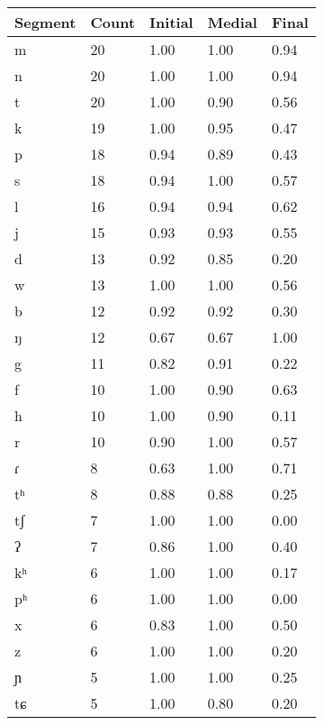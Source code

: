 \begin{longtable}{|l|l|l|l|l|}
\hline
Segment & Count & Initial & Medial & Final \\ \hline 
m        & 20    & 1.00    & 1.00   & 0.94  \\ \hline 
n        & 20    & 1.00    & 1.00   & 0.94  \\ \hline
t        & 20    & 1.00    & 0.90   & 0.56  \\ \hline
k        & 19    & 1.00    & 0.95   & 0.47  \\ \hline
p        & 18    & 0.94    & 0.89   & 0.43  \\ \hline
s        & 18    & 0.94    & 1.00   & 0.57  \\ \hline
l        & 16    & 0.94    & 0.94   & 0.62  \\ \hline
j        & 15    & 0.93    & 0.93   & 0.55  \\ \hline
d        & 13    & 0.92    & 0.85   & 0.20  \\ \hline
w        & 13    & 1.00    & 1.00   & 0.56  \\ \hline
b        & 12    & 0.92    & 0.92   & 0.30  \\ \hline
ŋ        & 12    & 0.67    & 0.67   & 1.00  \\ \hline
g        & 11    & 0.82    & 0.91   & 0.22  \\ \hline
f        & 10    & 1.00    & 0.90   & 0.63  \\ \hline
h        & 10    & 1.00    & 0.90   & 0.11  \\ \hline
r        & 10    & 0.90    & 1.00   & 0.57  \\ \hline
ɾ        & 8     & 0.63    & 1.00   & 0.71  \\ \hline
tʰ       & 8     & 0.88    & 0.88   & 0.25  \\ \hline
tʃ       & 7     & 1.00    & 1.00   & 0.00  \\ \hline
ʔ        & 7     & 0.86    & 1.00   & 0.40  \\ \hline
kʰ       & 6     & 1.00    & 1.00   & 0.17  \\ \hline
pʰ       & 6     & 1.00    & 1.00   & 0.00  \\ \hline
x        & 6     & 0.83    & 1.00   & 0.50  \\ \hline
z        & 6     & 1.00    & 1.00   & 0.20  \\ \hline
ɲ        & 5     & 1.00    & 1.00   & 0.25  \\ \hline
tɕ       & 5     & 1.00    & 0.80   & 0.20  \\ \hline

\end{longtable}
